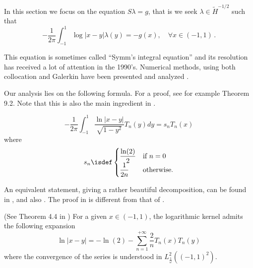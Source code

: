 \documentclass[a4paper]{article}
\begin{document}
	In this section we focus on the equation $S\lambda = g$, that is we seek $\lambda \in \tilde{H}^{-1/2}$ such that 
	\begin{equation}
	-\frac{1}{2\pi}\int_{-1}^{1} \log|x-y| \lambda(y) = -g(x), \quad \forall x\in (-1,1)\,.\label{Slambda}
	\end{equation} 
	
	This equation is sometimes called ``Symm's integral equation'' and its resolution has received a lot of attention in the 1990's. Numerical methods, using both collocation and Galerkin have been presented and analyzed \cite{atkinson1991numerical,yan1988integral,yan1990cosine,sloan1992collocation,yan1989mesh}. 
	
	
	Our analysis lies on the following formula. For a proof, see for example \cite{mason2002chebyshev} Theorem 9.2. Note that this is also the main ingredient in \cite{bruno2012second}.
	
	\begin{Prop}
		\[ -\frac{1}{2\pi}\int_{-1}^{1} \frac{\ln|x-y|}{\sqrt{1 - y^2}}T_n(y)dy = s_n T_n(x)\]
		where
		\[s_n \isdef \begin{cases}
		\dfrac{\ln(2)}{2} & \text{if } n=0\\
		\dfrac{1}{2n} & \text{otherwise}.
		\end{cases}\]
		\label{STn}
	\end{Prop}
	An equivalent statement, giving a rather beautiful decomposition, can be found in \cite{jerez2012explicit}, and also \cite{urzua2014optimal}. The proof in \cite{jerez2012explicit} is different from that of \cite{mason2002chebyshev}.
	\begin{The}(See Theorem 4.4 in \cite{jerez2012explicit})	
		\label{decompLnKernelTn}
		For a given $x \in (-1,1)$, the logarithmic kernel admits the following expansion 
		\[ \ln|x-y| = -\ln(2) - \sum_{n=1}^{+\infty} \frac{2}{n}T_n(x)T_n(y)\]
		where the convergence of the series is understood in $L^2_\frac{1}{\omega}((-1,1)^2)$.
	\end{The}
	
\end{document}

